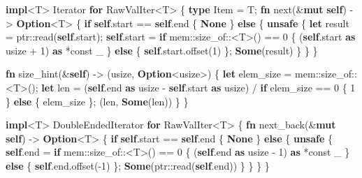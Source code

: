 \documentclass[a4paper,]{book}
\newenvironment{Shaded}{\begin{snugshade}}{\end{snugshade}}
\newcommand{\KeywordTok}[1]{\textcolor[rgb]{0.13,0.29,0.53}{\textbf{{#1}}}}
\newcommand{\DecValTok}[1]{\textcolor[rgb]{0.00,0.00,0.81}{{#1}}}
\newcommand{\NormalTok}[1]{{#1}}
\begin{document}
\begin{Shaded}
\begin{Highlighting}[]
\KeywordTok{impl}\NormalTok{<T> Iterator }\KeywordTok{for} \NormalTok{RawValIter<T> \{}
    \KeywordTok{type} \NormalTok{Item = T;}
    \KeywordTok{fn} \NormalTok{next(&}\KeywordTok{mut} \KeywordTok{self}\NormalTok{) -> }\KeywordTok{Option}\NormalTok{<T> \{}
        \KeywordTok{if} \KeywordTok{self}\NormalTok{.start == }\KeywordTok{self}\NormalTok{.end \{}
            \KeywordTok{None}
        \NormalTok{\} }\KeywordTok{else} \NormalTok{\{}
            \KeywordTok{unsafe} \NormalTok{\{}
                \KeywordTok{let} \NormalTok{result = ptr::read(}\KeywordTok{self}\NormalTok{.start);}
                \KeywordTok{self}\NormalTok{.start = }\KeywordTok{if} \NormalTok{mem::size_of::<T>() == }\DecValTok{0} \NormalTok{\{}
                    \NormalTok{(}\KeywordTok{self}\NormalTok{.start }\KeywordTok{as} \NormalTok{usize + }\DecValTok{1}\NormalTok{) }\KeywordTok{as} \NormalTok{*const _}
                \NormalTok{\} }\KeywordTok{else} \NormalTok{\{}
                    \KeywordTok{self}\NormalTok{.start.offset(}\DecValTok{1}\NormalTok{)}
                \NormalTok{\};}
                \KeywordTok{Some}\NormalTok{(result)}
            \NormalTok{\}}
        \NormalTok{\}}
    \NormalTok{\}}

    \KeywordTok{fn} \NormalTok{size_hint(&}\KeywordTok{self}\NormalTok{) -> (usize, }\KeywordTok{Option}\NormalTok{<usize>) \{}
        \KeywordTok{let} \NormalTok{elem_size = mem::size_of::<T>();}
        \KeywordTok{let} \NormalTok{len = (}\KeywordTok{self}\NormalTok{.end }\KeywordTok{as} \NormalTok{usize - }\KeywordTok{self}\NormalTok{.start }\KeywordTok{as} \NormalTok{usize)}
                  \NormalTok{/ }\KeywordTok{if} \NormalTok{elem_size == }\DecValTok{0} \NormalTok{\{ }\DecValTok{1} \NormalTok{\} }\KeywordTok{else} \NormalTok{\{ elem_size \};}
        \NormalTok{(len, }\KeywordTok{Some}\NormalTok{(len))}
    \NormalTok{\}}
\NormalTok{\}}

\KeywordTok{impl}\NormalTok{<T> DoubleEndedIterator }\KeywordTok{for} \NormalTok{RawValIter<T> \{}
    \KeywordTok{fn} \NormalTok{next_back(&}\KeywordTok{mut} \KeywordTok{self}\NormalTok{) -> }\KeywordTok{Option}\NormalTok{<T> \{}
        \KeywordTok{if} \KeywordTok{self}\NormalTok{.start == }\KeywordTok{self}\NormalTok{.end \{}
            \KeywordTok{None}
        \NormalTok{\} }\KeywordTok{else} \NormalTok{\{}
            \KeywordTok{unsafe} \NormalTok{\{}
                \KeywordTok{self}\NormalTok{.end = }\KeywordTok{if} \NormalTok{mem::size_of::<T>() == }\DecValTok{0} \NormalTok{\{}
                    \NormalTok{(}\KeywordTok{self}\NormalTok{.end }\KeywordTok{as} \NormalTok{usize - }\DecValTok{1}\NormalTok{) }\KeywordTok{as} \NormalTok{*const _}
                \NormalTok{\} }\KeywordTok{else} \NormalTok{\{}
                    \KeywordTok{self}\NormalTok{.end.offset(-}\DecValTok{1}\NormalTok{)}
                \NormalTok{\};}
                \KeywordTok{Some}\NormalTok{(ptr::read(}\KeywordTok{self}\NormalTok{.end))}
            \NormalTok{\}}
        \NormalTok{\}}
    \NormalTok{\}}
\NormalTok{\}}
\end{Highlighting}
\end{Shaded}
\end{document}
